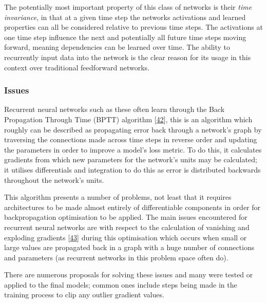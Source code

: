 \documentclass[12pt,]{article}
\begin{document}
The potentially most important property of this class of networks is
their \emph{time invariance}, in that at a given time step the networks
activations and learned properties can all be considered relative to
previous time steps. The activations at one time step influence the next
and potentially all future time steps moving forward, meaning
dependencies can be learned over time. The ability to recurrently input
data into the network is the clear reason for its usage in this context
over traditional feedforward networks.

\hypertarget{issues}{%
\subsubsection{Issues}\label{issues}}

Recurrent neural networks such as these often learn through the Back
Propagation Through Time (BPTT) algorithm
{[}\protect\hyperlink{ref-werbos1990backpropagation}{42}{]}, this is an
algorithm which roughly can be described as propagating error back
through a network's graph by traversing the connections made across time
steps in reverse order and updating the parameters in order to improve a
model's loss metric. To do this, it calculates gradients from which new
parameters for the network's units may be calculated; it utilises
differentials and integration to do this as error is distributed
backwards throughout the network's units.

This algorithm presents a number of problems, not least that it requires
architectures to be made almost entirely of differentiable components in
order for backpropagation optimisation to be applied. The main issues
encountered for recurrent neural networks are with respect to the
calculation of vanishing and exploding gradients
{[}\protect\hyperlink{ref-pascanu2012understanding}{43}{]} during this
optimisation which occurs when small or large values are propagated back
in a graph with a huge number of connections and parameters (as
recurrent networks in this problem space often do).

There are numerous proposals for solving these issues and many were
tested or applied to the final models; common ones include steps being
made in the training process to clip any outlier gradient values.
\end{document}
